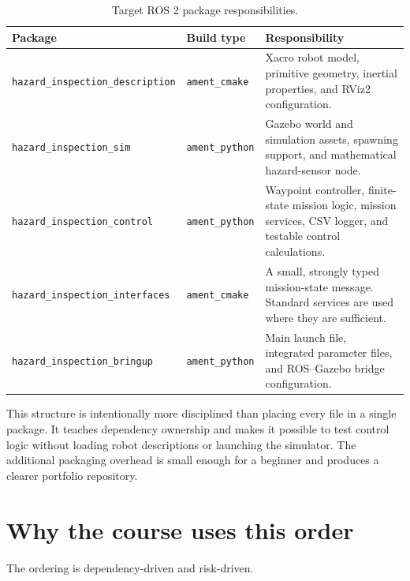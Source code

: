 \documentclass[11pt]{article}
\begin{document}
\begin{table}[htbp]
\centering
\small
\begin{tabularx}{\textwidth}{@{}l l X@{}}
\toprule
\textbf{Package} & \textbf{Build type} & \textbf{Responsibility} \\
\midrule
\texttt{hazard\_inspection\_description}
  & \texttt{ament\_cmake}
  & Xacro robot model, primitive geometry, inertial properties, and RViz2
    configuration. \\
\texttt{hazard\_inspection\_sim}
  & \texttt{ament\_python}
  & Gazebo world and simulation assets, spawning support, and mathematical
    hazard-sensor node. \\
\texttt{hazard\_inspection\_control}
  & \texttt{ament\_python}
  & Waypoint controller, finite-state mission logic, mission services, CSV
    logger, and testable control calculations. \\
\texttt{hazard\_inspection\_interfaces}
  & \texttt{ament\_cmake}
  & A small, strongly typed mission-state message. Standard services are used
    where they are sufficient. \\
\texttt{hazard\_inspection\_bringup}
  & \texttt{ament\_python}
  & Main launch file, integrated parameter files, and ROS--Gazebo bridge
    configuration. \\
\bottomrule
\end{tabularx}
\caption{Target ROS 2 package responsibilities.}
\end{table}

This structure is intentionally more disciplined than placing every file in a
single package. It teaches dependency ownership and makes it possible to test
control logic without loading robot descriptions or launching the simulator.
The additional packaging overhead is small enough for a beginner and produces
a clearer portfolio repository.

\section{Why the course uses this order}

The ordering is dependency-driven and risk-driven.
\end{document}
